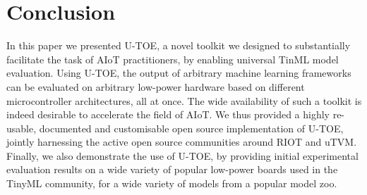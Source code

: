 
\section{Conclusion}
In this paper we presented U-TOE, a novel toolkit we designed to substantially facilitate the task of AIoT practitioners, by enabling universal TinML model evaluation. Using U-TOE, the output of arbitrary machine learning frameworks can be evaluated on arbitrary low-power hardware based on different microcontroller architectures, all at once. The wide availability of such a toolkit is indeed desirable to accelerate the field of AIoT. We thus provided a highly re-usable, documented and customisable open source implementation of U-TOE, jointly harnessing the active open source communities around RIOT and uTVM. Finally, we also demonstrate the use of U-TOE, by providing initial experimental evaluation results on a wide variety of popular low-power boards used in the TinyML community, for a wide variety of models from a popular model zoo. 